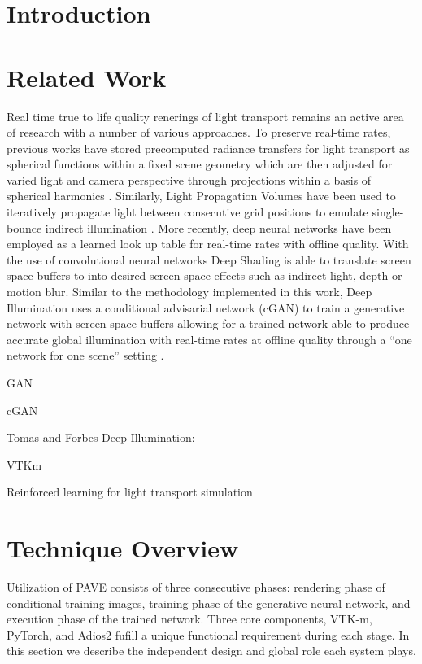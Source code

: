 \documentclass[sigconf,authordraft]{acmart}
\begin{document}
\section{Introduction}


\section{Related Work}

Real time true to life quality renerings of light transport remains an active area of research with a number of various approaches. To preserve real-time rates, previous works have stored precomputed radiance transfers for light transport as spherical functions within a fixed scene geometry which are then adjusted for varied light and camera perspective through projections within a basis of spherical harmonics \cite{sloanPrecompRad}. Similarly, Light Propagation Volumes have been used to iteratively propagate light between consecutive grid positions to emulate single-bounce indirect illumination \cite{kaplanyanCasac}. More recently, deep neural  networks have been employed as a learned look up table for real-time rates with offline quality. With the use of convolutional neural networks Deep Shading is able to translate screen space buffers to into desired screen space effects such as indirect light, depth or motion blur. Similar to the methodology implemented in this work, Deep Illumination uses a conditional advisarial network (cGAN) to train a generative network with screen space buffers allowing for a trained network able to produce accurate global illumination with real-time rates at offline quality through a ``one network for one scene'' setting  \cite{deepillum}.

GAN \cite{goodfellowGAN}

cGAN \cite{mirzacGAN}

Tomas and Forbes Deep Illumination:

VTKm \cite{vtkm}

Reinforced learning for light transport simulation \cite{dahmTransport}

\section{Technique Overview}

Utilization of PAVE consists of three consecutive phases: rendering phase of conditional training images, training phase of the generative neural network, and execution phase of the trained network. Three core components, VTK-m, PyTorch, and Adios2 fufill a unique functional requirement during each stage. In this section we describe the independent design and global role each system plays.
\end{document}
